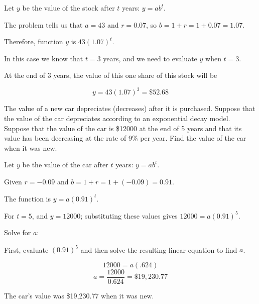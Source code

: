 \begin{solution}
    Let \( y \) be the value of the stock after \( t \) years: \( y = ab^t \).

    The problem tells us that \( a = 43 \) and \( r = 0.07 \), so \( b = 1 + r = 1 + 0.07 = 1.07 \).

    Therefore, function \( y \) is \( 43(1.07)^t \).

    In this case we know that \( t = 3 \) years, and we need to evaluate \( y \) when \( t = 3 \).

    At the end of 3 years, the value of this one share of this stock will be

    \[ y = 43(1.07)^3 = \$52.68 \]
\end{solution}

\begin{example}
    The value of a new car depreciates (decreases) after it is purchased. Suppose that the value of the car depreciates according to an exponential decay model. Suppose that the value of the car is \$12000 at the end of 5 years and that its value has been decreasing at the rate of 9\% per year. Find the value of the car when it was new.
\end{example}

\begin{solution}
    Let \( y \) be the value of the car after \( t \) years: \( y = ab^t \).

    Given \( r = -0.09 \) and \( b = 1 + r = 1 + (-0.09) = 0.91 \).

    The function is \( y = a(0.91)^t \).

    For \( t = 5 \), and \( y = 12000 \); substituting these values gives \( 12000 = a(0.91)^5 \).

    Solve for \( a \):

    First, evaluate \( (0.91)^5 \) and then solve the resulting linear equation to find \( a \).

    \[ 12000 = a(.624) \]
    \[ a = \frac{12000}{0.624} = \$19,230.77 \]

    The car's value was \$19,230.77 when it was new.
\end{solution}



